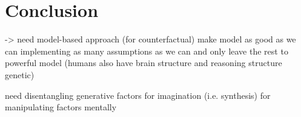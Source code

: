 

\chapter{Conclusion}
-> need model-based approach (for counterfactual)
make model as good as we can implementing as many assumptions as we can and only leave the rest to powerful model
(humans also have brain structure and reasoning structure genetic)

need disentangling generative factors for imagination (i.e. synthesis)
for manipulating factors mentally
